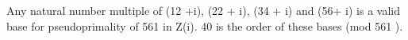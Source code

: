 \documentclass[12pt]{article}
\begin{document}
Any  natural  number  multiple  of (12 +i), (22 + i), (34 + i)  and
(56+ i)  is  a  valid base  for  pseudoprimality  of 561  in
Z(i). 40  is  the  order  of these   bases  (mod  561 ).
\end{document}
